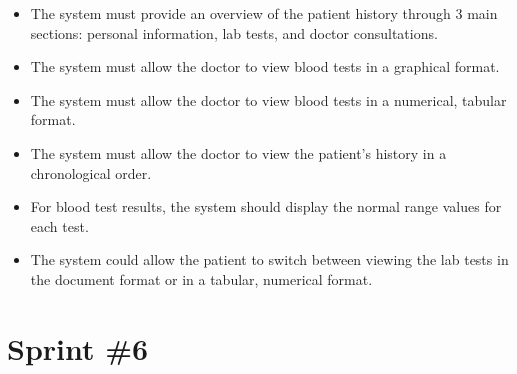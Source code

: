 \begin{itemize}
  \item The system must provide an overview of the patient history through 3 main sections: personal information, lab tests, and doctor consultations.
  \item The system must allow the doctor to view blood tests in a graphical format.
  \item The system must allow the doctor to view blood tests in a numerical, tabular format.
  \item The system must allow the doctor to view the patient's history in a chronological order.
  \item For blood test results, the system should display the normal range values for each test.
  \item The system could allow the patient to switch between viewing the lab tests in the document format or in a tabular, numerical format.
\end{itemize}

\section{Sprint \#6}